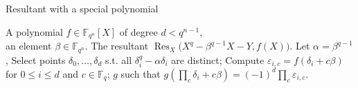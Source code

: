 \documentclass{sig-alternate}
\newcommand{\ff}[1]{\mathbb{F}_{#1}}
\newcommand{\dd}{d}
\newcommand{\qq}{q}
\newcommand{\nn}{n}
\newcommand{\qn}{{\qq^\nn}}
\newcommand{\basef}{\ff{\qq}}
\newcommand{\extf}{\ff{\qn}}
\DeclareMathOperator{\Res}{Res}
\newcounter{algo}
\begin{document}
\begin{algorithm}
  \caption{Resultant with a special polynomial}
  \label{alg:resultant}
  \begin{algorithmic}[1]
    \REQUIRE A polynomial $f\in\extf[X]$ of degree $\dd<\qq^{n-1}$,\\
    an element $\beta\in\extf$.
    \ENSURE The resultant $\Res_X\bigl(X^\qq-\beta^{\qq-1}X-Y,f(X)).$
    \STATE Let $\alpha=\beta^{\qq-1}$,
    \STATE\label{alg:resultant:select} Select points $\delta_0,\dots,\delta_d$ s.t. all $\delta_i^\qq-\alpha\delta_i$ are distinct;
    \STATE\label{alg:resultant:multi-ev} Compute $\varepsilon_{i,c}=f(\delta_i+c\beta)$ for $0\le i\le\dd$ and $c\in\basef$;
    \RETURN\label{alg:resultant:interp} $g$ such that $g\left(\prod_c\delta_i+c\beta\right) = (-1)^{\dd}  \prod_c\varepsilon_{i,c}$.
  \end{algorithmic}
\end{algorithm}
\end{document}

